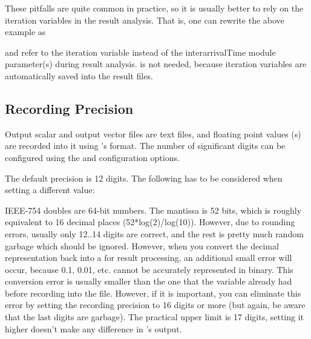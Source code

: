 These pitfalls are quite common in practice, so it is usually better
to rely on the iteration variables in the result analysis.
That is, one can rewrite the above example as


and refer to the  iteration variable instead of the
interarrivalTime module parameter(s) during result analysis.
 is not needed, because iteration variables are
automatically saved into the result files.


\subsection{Recording Precision}
\label{sec:outputfile-precision}

Output scalar and output vector files are text files, and floating point
values (s) are recorded into it using 's
 format. The number of significant digits can be configured
using the  and 
configuration options.

The default precision is 12 digits. The following has to be considered when
setting a different value:

IEEE-754 doubles are 64-bit numbers. The mantissa is 52 bits, which is
roughly equivalent to 16 decimal places (52*log(2)/log(10)). However, due
to rounding errors, usually only 12..14 digits are correct, and the rest is
pretty much random garbage which should be ignored. However, when you
convert the decimal representation back into a  for result
processing, an additional small error will occur, because 0.1, 0.01, etc.
cannot be accurately represented in binary. This conversion error is
usually smaller than the one that the  variable already had
before recording into the file. However, if it is important, you can
eliminate this error by setting the recording precision to 16 digits or
more (but again, be aware that the last digits are garbage). The practical
upper limit is 17 digits, setting it higher doesn't make any difference in
's output.

%
%
%


